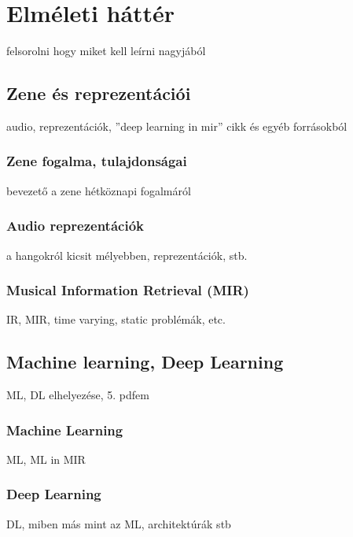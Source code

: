 \chapter{Elméleti háttér} 
\label{ch:theory}

felsorolni hogy miket kell leírni nagyjából

\section{Zene és reprezentációi} 

audio, reprezentációk, ''deep learning in mir'' cikk és egyéb forrásokból

\subsection{Zene fogalma, tulajdonságai}
bevezető a zene hétköznapi fogalmáról

\subsection{Audio reprezentációk}

a hangokról kicsit mélyebben, reprezentációk, stb.

\subsection{Musical Information Retrieval (MIR)} 

IR, MIR, time varying, static problémák, etc.

\section{Machine learning, Deep Learning}

ML, DL elhelyezése, 5. pdfem

\subsection{Machine Learning}

ML, ML in MIR

\subsection{Deep Learning}

DL, miben más mint az ML, architektúrák stb